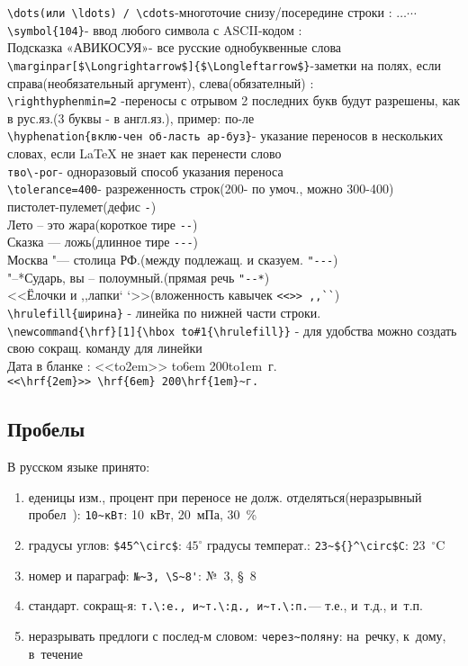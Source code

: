 \documentclass[a4paper,12pt]{article}%
\theoremstyle{plain}%
\theoremstyle{definition}%
\theoremstyle{remark}%
\begin{document}
\verb|\dots(или \ldots) / \cdots|-многоточие снизу/посередине строки : $\ldots\cdots$\\
\verb|\symbol{104}|-  ввод любого символа с ASCII-кодом : \\
Подсказка «АВИКОСУЯ»- все русские однобуквенные слова\\
\verb|\marginpar[$\Longrightarrow$]{$\Longleftarrow$}|-заметки на полях, если справа(необязательный аргумент), слева(обязателный) : \marginpar[$\rightarrow$]{$\leftarrow$}\\
\verb|\righthyphenmin=2| -переносы с отрывом 2 последних букв будут разрешены, как в рус.яз.(3 буквы - в англ.яз.), пример: по-ле \\
\verb|\hyphenation{вклю-чен об-ласть ар-буз}|- указание переносов в нескольких словах, если LaTeX не знает как перенести слово \\
\verb|тво\-рог|- одноразовый способ указания переноса \\
\verb|\tolerance=400|- разреженность строк(200- по умоч., можно 300-400) \\
пистолет-пулемет(дефис \verb|-|) \\
Лето -- это жара(короткое тире \verb|--|) \\
Сказка --- ложь(длинное тире \verb|---|) \\
Москва "--- столица РФ.(между подлежащ. и сказуем. \verb|"---|) \\
"--*Сударь, вы -- полоумный.(прямая речь \verb|"--*|) \\
<<Ёлочки и ,,лапки` `>>(вложенность кавычек \verb|<<>> ,,``|) \\
\verb|\hrulefill{ширина}| - линейка по нижней части строки. \\
\newcommand{\hrf}[1]{\hbox to#1{\hrulefill}}
\verb|\newcommand{\hrf}[1]{\hbox to#1{\hrulefill}}| - для удобства можно создать свою сокращ. команду для линейки \\
Дата в бланке : <<\hrf{2em}>> \hrf{6em} 200\hrf{1em}~г. \\
\verb|<<\hrf{2em}>> \hrf{6em} 200\hrf{1em}~г.|



\subsection{Пробелы}

В русском языке принято:

\begin{enumerate}
\item еденицы изм., процент при переносе не долж. отделяться(неразрывный пробел~): \verb|10~кВт|: 10~кВт, 20~мПа, 30~\%
\item градусы углов: \verb|$45^\circ$|: $45^\circ$     градусы температ.: \verb|23~${}^\circ$C|: 23~${}^\circ$C
\item номер и параграф: \verb|№~3, \S~8'|: №~3, \S~8
\item стандарт. сокращ-я: \verb|т.\:е., и~т.\:д., и~т.\:п.|--- т.\:е., и~т.\:д., и~т.\:п.
\item неразрывать предлоги с послед-м словом: \verb|через~поляну|: на~речку, к~дому, в~течение
\end{enumerate}
\end{document}
